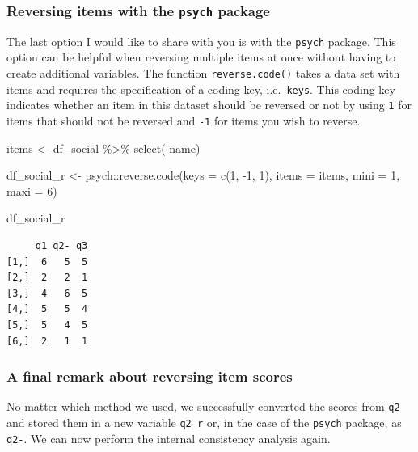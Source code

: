 \documentclass[
  letterpaper,
]{krantz}
\makeatletter
\newenvironment{Shaded}{\begin{snugshade}}{\end{snugshade}}
\newcommand{\AttributeTok}[1]{\textcolor[rgb]{0.40,0.45,0.13}{#1}}
\newcommand{\DecValTok}[1]{\textcolor[rgb]{0.68,0.00,0.00}{#1}}
\newcommand{\FunctionTok}[1]{\textcolor[rgb]{0.28,0.35,0.67}{#1}}
\newcommand{\NormalTok}[1]{\textcolor[rgb]{0.00,0.23,0.31}{#1}}
\newcommand{\OtherTok}[1]{\textcolor[rgb]{0.00,0.23,0.31}{#1}}
\newcommand{\SpecialCharTok}[1]{\textcolor[rgb]{0.37,0.37,0.37}{#1}}
\newenvironment{kframe}{%
\medskip{}
\setlength{\fboxsep}{.8em}
 \def\at@end@of@kframe{}%
 \ifinner\ifhmode%
  \def\at@end@of@kframe{\end{minipage}}%
  \begin{minipage}{\columnwidth}%
 \fi\fi%
 \def\FrameCommand##1{\hskip\@totalleftmargin \hskip-\fboxsep
 \colorbox{shadecolor}{##1}\hskip-\fboxsep
     \hskip-\linewidth \hskip-\@totalleftmargin \hskip\columnwidth}%
 \MakeFramed {\advance\hsize-\width
   \@totalleftmargin\z@ \linewidth\hsize
   \@setminipage}}%
 {\par\unskip\endMakeFramed%
 \at@end@of@kframe}
\renewenvironment{Shaded}{\begin{kframe}}{\end{kframe}}
\makeatother
\begin{document}
\subsubsection{\texorpdfstring{Reversing items with the \texttt{psych}
package}{Reversing items with the psych package}}\label{reversing-items-psych}

The last option I would like to share with you is with the
\texttt{psych} package. This option can be helpful when reversing
multiple items at once without having to create additional variables.
The function \texttt{reverse.code()} takes a data set with items and
requires the specification of a coding key, i.e.~\texttt{keys}. This
coding key indicates whether an item in this dataset should be reversed
or not by using \texttt{1} for items that should not be reversed and
\texttt{-1} for items you wish to reverse.

\begin{Shaded}
\begin{Highlighting}[]
\NormalTok{items }\OtherTok{\textless{}{-}}\NormalTok{ df\_social }\SpecialCharTok{\%\textgreater{}\%} \FunctionTok{select}\NormalTok{(}\SpecialCharTok{{-}}\NormalTok{name)}

\NormalTok{df\_social\_r }\OtherTok{\textless{}{-}}\NormalTok{ psych}\SpecialCharTok{::}\FunctionTok{reverse.code}\NormalTok{(}\AttributeTok{keys =} \FunctionTok{c}\NormalTok{(}\DecValTok{1}\NormalTok{, }\SpecialCharTok{{-}}\DecValTok{1}\NormalTok{, }\DecValTok{1}\NormalTok{),}
                      \AttributeTok{items =}\NormalTok{ items,}
                      \AttributeTok{mini =} \DecValTok{1}\NormalTok{,}
                      \AttributeTok{maxi =} \DecValTok{6}\NormalTok{)}

\NormalTok{df\_social\_r}
\end{Highlighting}
\end{Shaded}

\begin{verbatim}
     q1 q2- q3
[1,]  6   5  5
[2,]  2   2  1
[3,]  4   6  5
[4,]  5   5  4
[5,]  5   4  5
[6,]  2   1  1
\end{verbatim}

\subsubsection{A final remark about reversing item
scores}\label{reversing-items-final-remark}

No matter which method we used, we successfully converted the scores
from \texttt{q2} and stored them in a new variable \texttt{q2\_r} or, in
the case of the \texttt{psych} package, as \texttt{q2-}. We can now
perform the internal consistency analysis again.
\end{document}
